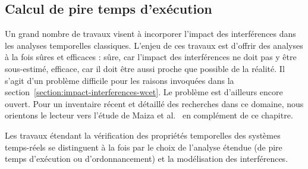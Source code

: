 \subsection{Calcul de pire temps d'exécution}

Un grand nombre de travaux visent à incorporer l'impact des interférences dans les analyses temporelles classiques.
L'enjeu de ces travaux est d'offrir des analyses à la fois sûres et efficaces : sûre, car l'impact des interférences ne doit pas y être sous-estimé, efficace, car il doit être aussi proche que possible de la réalité.
Il s'agit d'un problème difficile pour les raisons invoquées dans la section~\ref{section:impact-interferences-wcet}.
Le problème est d'ailleurs encore ouvert.
Pour un inventaire récent et détaillé des recherches dans ce domaine, nous orientons le lecteur vers l'étude de Maiza et al.~\cite{maiza2018survey} en complément de ce chapitre.

Les travaux étendant la vérification des propriétés temporelles des systèmes temps-réels se distinguent à la fois par le choix de l'analyse étendue (de pire temps d'exécution ou d'ordonnancement) et la modélisation des interférences.


